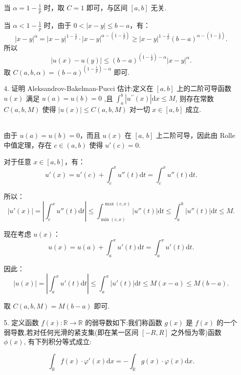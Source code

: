 \begin{enumerate}
\begin{solution}
        当 $\displaystyle\alpha = 1 - \frac{1}{p}$ 时，取 $C = 1$ 即可，与区间 $[a,b]$ 无关.

        当 $\displaystyle\alpha < 1 - \frac{1}{p}$ 时，由于 $0<|x-y| \leq b-a$，有：
        \[
        |x-y|^\alpha = |x-y|^{1-\frac{1}{p}} \cdot |x-y|^{\alpha - (1-\frac{1}{p})} \geq |x-y|^{1-\frac{1}{p}} (b-a)^{\alpha - (1-\frac{1}{p})}.
        \]
        所以
        \[
        |u(x) - u(y)| \leq (b-a)^{(1-\frac{1}{p})-\alpha} |x-y|^\alpha.
        \]
        取 $\displaystyle C(a,b,\alpha) = (b-a)^{(1-\frac{1}{p})-\alpha}$ 即可.
    \end{solution}

    \item[4.]证明 Aleksandrov-Bakelman-Pucci 估计:定义在 \([a,b]\) 上的二阶可导函数 \(u(x)\) 满足 \(u(a) = u(b) = 0\) ,且 \(\displaystyle\int_{a}^{b}|u^{\prime \prime}(x)|\mathrm{d}x\leq M\),
    则存在常数 \(C(a,b,M)\) 使得 \(\displaystyle |u(x)|\leq C(a,b,M)\) 对一切 \(x\in [a,b]\) 成立.
    \begin{solution}\\
        由于 $u(a) = u(b) = 0$，而且 $u(x)$ 在 $[a,\,b]$ 上二阶可导，因此由 Rolle 中值定理，存在 $c \in (a,b)$ 使得 $u'(c) = 0$.

        对于任意 $x \in [a,b]$，有：
        \[
        u'(x) = u'(c) + \int_c^x u''(t)\mathrm{d}t = \int_c^x u''(t) \mathrm{d}t.
        \]

        所以：
        \[
        |u'(x)| = \left| \int_c^x u''(t) \mathrm{d}t \right| \leq \int_{\min(c,x)}^{\max(c,x)} |u''(t)| \mathrm{d}t \leq \int_a^b |u''(t)| \mathrm{d}t \leq M.
        \]

        现在考虑 $u(x)$：
        \[
        u(x) = u(a) + \int_a^x u'(t) \mathrm{d}t = \int_a^x u'(t) \mathrm{d}t.
        \]

        因此：
        \[
        |u(x)| = \left| \int_a^x u'(t) \mathrm{d}t \right| \leq \int_a^x |u'(t)| \mathrm{d}t \leq M(x-a) \leq M(b-a).
        \]

        取 $\displaystyle C(a,b,M) = M(b-a)$ 即可.
    \end{solution}

    \item[5.]定义函数 \(\displaystyle f(x):\mathbb{R}\to \mathbb{R}\) 的弱导数如下:我们称函数 \(g(x)\) 是 \(f(x)\) 的一个弱导数,若对任何光滑的紧支集(即在某一区间 \([-R,R]\) 之外恒为零)函数 \(\phi (x)\), 有下列积分等式成立:

    \[\displaystyle \int_{\mathbb{R}}f(x)\cdot \varphi '(x)\mathrm{d}x = -\int_{\mathbb{R}}g(x)\cdot \varphi (x)\mathrm{d}x.\]


\end{enumerate}
